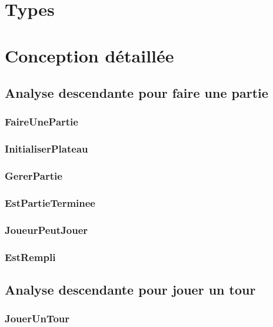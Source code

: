   \newpage
  \section{Types}
    
    

  \newpage
  \section{Conception détaillée}
  \subsection{Analyse descendante pour faire une partie}
     \subsubsection{FaireUnePartie}
      
    \subsubsection{InitialiserPlateau}
      
    \subsubsection{GererPartie}
      
    \subsubsection{EstPartieTerminee}
      
    \subsubsection{JoueurPeutJouer}
      
    \subsubsection{EstRempli}
      

  \subsection{Analyse descendante pour jouer un tour}
    \subsubsection{JouerUnTour}
      
